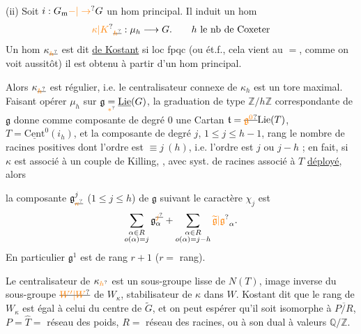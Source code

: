 (ii) Soit $i:G_{\mathrm m}\unsure{-|\to}G$ un hom principal. Il induit un hom
\[
\unsure{\kappa|K}_{\deleted{\unsure{h}}}:\mu_h\longrightarrow G.\qquad h\ \text{le nb de Coxeter}
\]
Un hom $\kappa_{\deleted{\unsure{h}}}$ est dit  \uline{de Kostant} si loc fpqc (ou ét.f., cela vient au $=$, comme on voit aussitôt) il est obtenu à partir d'un hom principal.

 Alors $\kappa_{\deleted{\unsure{h}}}$ est régulier, i.e. le centralisateur connexe de $\kappa_h$ est un tore maximal. Faisant opérer $\mu_h$ sur $\mathfrak g\mathrel{\underset{\unsure{*}}{=}}\underline{\mathrm{Lie}}(G)$, la graduation de type $\mathbb Z/h\mathbb Z$ correspondante de $\mathfrak g$ donne comme composante de degré $0$ une  Cartan $\mathfrak t=\deleted{\unsure{\mathfrak g^0}}\mathrm{Lie}(T)$, $T=\underline{\mathrm{Cent}}^{0}(i_h)$, et la composante de degré $j$, $1\leq j\leq h-1$,  rang le nombre de racines positives dont l'ordre est $\equiv j\ (h)$, i.e.  l'ordre est $j$ ou $j-h$ ; en fait, si $\kappa$ est associé à un couple de Killing, ,  avec syst. de racines associé à $T$ \uline{déployé}, alors

la composante ${\mathfrak g}^{j}_{\deleted{\unsure{\kappa}}}$ ($1\leq j\leq h$) de $\mathfrak g$ suivant le caractère $\chi_j$ est
\[
\sum_{\substack{\alpha\in R\\o(\alpha)=j}}\mathfrak g^{\deleted{\unsure{j}}}_{\alpha}
+\sum_{\substack{\alpha\in R\\o(\alpha)=j-h}}\unsure{\widetilde{\mathfrak g}|\mathfrak g}_{\alpha}.
\]
En particulier $\mathfrak g^{1}$ est de rang $r+1$ ($r=$ rang).

Le centralisateur de $\kappa_{\unsure{h}}$ est un sous-groupe lisse de $N(T)$, image inverse du sous-groupe $\deleted{\unsure{W'|W}}$ de $W_{\kappa}$,  stabilisateur de $\kappa$ dans $W$. Kostant dit que le rang de $W_{\kappa}$ est égal à celui du centre de $\widetilde G$, et on peut espérer qu'il soit isomorphe à $\overline{P/R}$, $P=\widehat T=$ réseau des poids, $R=$ réseau des racines,  ou à son dual  à valeurs  $\mathbb Q/\mathbb Z$.

